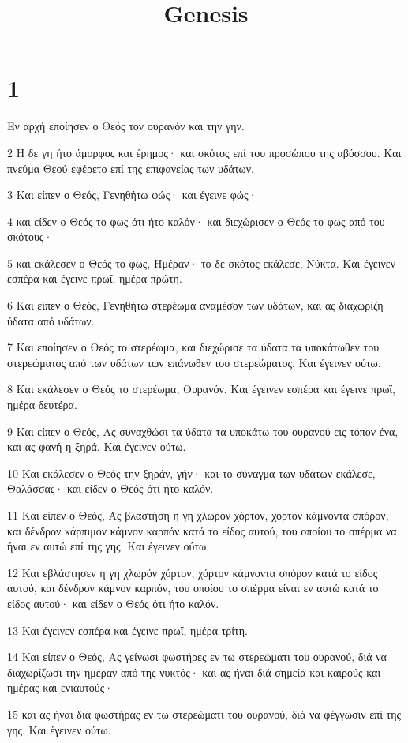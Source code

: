 

\title{Genesis}


\chapter{1}

\par Εν αρχή εποίησεν ο Θεός τον ουρανόν και την γην.
\par 2 Η δε γη ήτο άμορφος και έρημος· και σκότος επί του προσώπου της αβύσσου. Και πνεύμα Θεού εφέρετο επί της επιφανείας των υδάτων.
\par 3 Και είπεν ο Θεός, Γενηθήτω φώς· και έγεινε φώς·
\par 4 και είδεν ο Θεός το φως ότι ήτο καλόν· και διεχώρισεν ο Θεός το φως από του σκότους·
\par 5 και εκάλεσεν ο Θεός το φως, Ημέραν· το δε σκότος εκάλεσε, Νύκτα. Και έγεινεν εσπέρα και έγεινε πρωΐ, ημέρα πρώτη.
\par 6 Και είπεν ο Θεός, Γενηθήτω στερέωμα αναμέσον των υδάτων, και ας διαχωρίζη ύδατα από υδάτων.
\par 7 Και εποίησεν ο Θεός το στερέωμα, και διεχώρισε τα ύδατα τα υποκάτωθεν του στερεώματος από των υδάτων των επάνωθεν του στερεώματος. Και έγεινεν ούτω.
\par 8 Και εκάλεσεν ο Θεός το στερέωμα, Ουρανόν. Και έγεινεν εσπέρα και έγεινε πρωΐ, ημέρα δευτέρα.
\par 9 Και είπεν ο Θεός, Ας συναχθώσι τα ύδατα τα υποκάτω του ουρανού εις τόπον ένα, και ας φανή η ξηρά. Και έγεινεν ούτω.
\par 10 Και εκάλεσεν ο Θεός την ξηράν, γήν· και το σύναγμα των υδάτων εκάλεσε, Θαλάσσας· και είδεν ο Θεός ότι ήτο καλόν.
\par 11 Και είπεν ο Θεός, Ας βλαστήση η γη χλωρόν χόρτον, χόρτον κάμνοντα σπόρον, και δένδρον κάρπιμον κάμνον καρπόν κατά το είδος αυτού, του οποίου το σπέρμα να ήναι εν αυτώ επί της γης. Και έγεινεν ούτω.
\par 12 Και εβλάστησεν η γη χλωρόν χόρτον, χόρτον κάμνοντα σπόρον κατά το είδος αυτού, και δένδρον κάμνον καρπόν, του οποίου το σπέρμα είναι εν αυτώ κατά το είδος αυτού· και είδεν ο Θεός ότι ήτο καλόν.
\par 13 Και έγεινεν εσπέρα και έγεινε πρωΐ, ημέρα τρίτη.
\par 14 Και είπεν ο Θεός, Ας γείνωσι φωστήρες εν τω στερεώματι του ουρανού, διά να διαχωρίζωσι την ημέραν από της νυκτός· και ας ήναι διά σημεία και καιρούς και ημέρας και ενιαυτούς·
\par 15 και ας ήναι διά φωστήρας εν τω στερεώματι του ουρανού, διά να φέγγωσιν επί της γης. Και έγεινεν ούτω.
